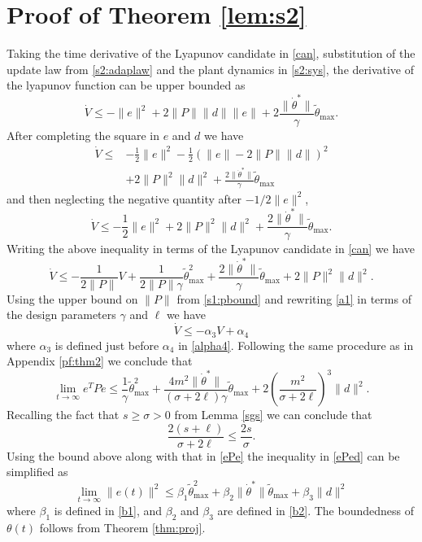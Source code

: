 \documentclass[10pt,journal]{IEEEtran}
\theoremstyle{plain}%
\theoremstyle{definition}
\newcommand{\be}[0]{\begin{equation}}
\newcommand{\ee}[0]{\end{equation}}
\newcommand{\ben}[0]{\begin{equation*}}
\newcommand{\een}[0]{\end{equation*}}
\newcommand{\norms}[1]{\lVert#1\rVert}
\newcommand{\normB}[0]{\norms}
\let\norm=\normB
\begin{document}
\section{Proof of Theorem \ref{lem:s2}}\label{thm34}
\begin{IEEEproof} Taking the time derivative of the Lyapunov candidate in \eqref{can}, substitution of the update law from \eqref{s2:adaplaw} and the plant dynamics in \eqref{s2:sys}, the derivative of the lyapunov function can be upper bounded as 
\ben
\dot V \leq -  \norm{e}^2 + 2 \norm P \norm  d \norm e+ 2 \frac{ \norm{\dot\theta^*}}{\gamma}\tilde \theta_\text{max}.
\een
After completing the square in $e$ and $d$ we have 
\ben\label{a1}\begin{split}
\dot V \leq& -\frac 1 2  \norm{e}^2 -  \frac 1 2 \left(  \norm e -  2 \norm P \norm d  \right)^2 \\ 
& + 2 \norm P ^2 \norm d^2  + \frac{ 2\normB{\dot\theta^*}}{\gamma}\tilde \theta_\text{max}
\end{split}\een
and then neglecting the negative quantity after $-1/2\norm e^2$,
\ben
 \dot V \leq -\frac 1 2  \norm{e}^2 + 2 \norm P ^2 \norm d^2  + \frac{ 2\norm{\dot\theta^*}}{\gamma}\tilde \theta_\text{max}.
\een
Writing the above inequality in terms of the Lyapunov candidate in \eqref{can} we have
\be\label{a1}
\dot V  \leq -\frac{1}{2 \norm P} V + \frac {1} {2 \norm P \gamma} \tilde\theta_\text{max}^2 + \frac {2\norm{\dot\theta^*}} \gamma \tilde \theta_\text{max}  +2 \norm P ^2 \norm d^2. 
\ee
Using the upper bound on $\norm P$ from \eqref{s1:pbound}  and rewriting \eqref{a1} in terms of the design parameters $\gamma$ and $\ell$ we have
\be
\dot V \leq -\alpha_3 V + \alpha_4
\ee
where $\alpha_3$ is defined just before $\alpha_4$ in \eqref{alpha4}.
Following the same procedure as in Appendix \ref{pf:thm2} we conclude that
\be\label{ePed}
\lim_{t\rightarrow\infty}{e^TPe} \leq \frac 1 \gamma \tilde\theta^2_\text{max} +  \frac {4m^2\norm{\dot\theta^*}} {(\sigma+2\ell)\gamma} \tilde \theta_\text{max}  +2 \left(\frac{m^2}{\sigma+2\ell}\right) ^3 \norm d^2.\ee
Recalling the fact that ${s\geq\sigma>0}$ from Lemma \ref{sgs} we can conclude that
\be\label{spl}
\frac{2(s+\ell)}{\sigma+2\ell}\leq \frac{2s}{\sigma}.
\ee
Using the bound above along with that in \eqref{ePe} the inequality in \eqref{ePed} can be simplified as 
\be
\lim_{t\rightarrow\infty}\norm {e(t)}^2 \leq \beta_1 \tilde\theta^2_\text{max} + \beta_2 \norm{\dot\theta^*}  \tilde\theta_\text{max}+\beta_3 \norm d^2
\ee
where $\beta_1$ is defined in \eqref{b1}, and $\beta_2$ and $\beta_3$ are defined in \eqref{b2}. The boundedness of $\theta(t)$ follows from Theorem \ref{thm:proj}.\end{IEEEproof}
\end{document}
